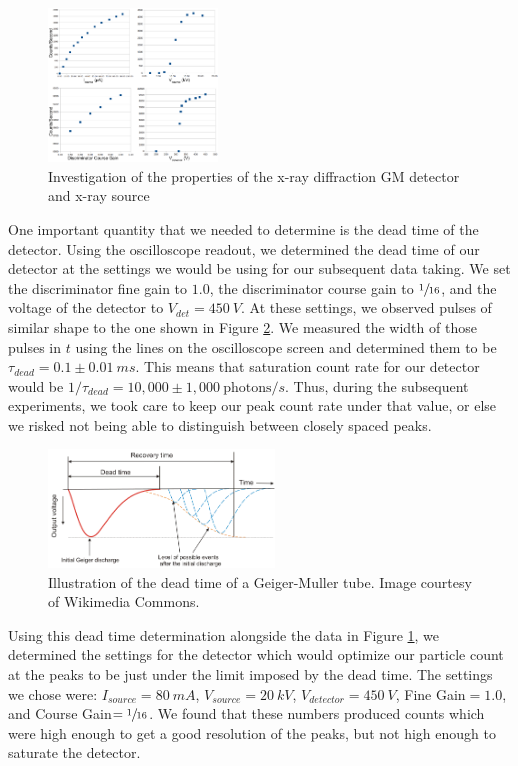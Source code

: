 \documentclass[%
 reprint,
 amsmath,amssymb,
 aps,
 pra,
]{revtex4-1}
\begin{document}
\begin{figure}[H]
	\centering
	\includegraphics[width=0.4\textwidth]{xrd_setup_investigation.png}
	\caption{Investigation of the properties of the x-ray diffraction GM detector and x-ray source}
	\label{fig:xrf_setup_investigation}
\end{figure}

One important quantity that we needed to determine is the dead time of the detector. Using the oscilloscope readout, we determined the dead time of our detector at the settings we would be using for our subsequent data taking. We set the discriminator fine gain to $1.0$, the discriminator course gain to $\sfrac{1}{16}$, and the voltage of the detector to $V_{det} = 450~V$. At these settings, we observed pulses of similar shape to the one shown in Figure \ref{fig:dead_time}. We measured the width of those pulses in $t$ using the lines on the oscilloscope screen and determined them to be $\tau_{dead} = 0.1 \pm 0.01~ms$. This means that saturation count rate for our detector would be $1/\tau_{dead} = 10,000 \pm 1,000~\text{photons}/s$. Thus, during the subsequent experiments, we took care to keep our peak count rate under that value, or else we risked not being able to distinguish between closely spaced peaks.

\begin{figure}[H]
	\centering
	\includegraphics[width=6cm]{dead_time.png}
	\caption{Illustration of the dead time of a Geiger-Muller tube. Image courtesy of Wikimedia Commons.}
	\label{fig:dead_time}
\end{figure}

Using this dead time determination alongside the data in Figure \ref{fig:xrf_setup_investigation}, we determined the settings for the detector which would optimize our particle count at the peaks to be just under the limit imposed by the dead time. The settings we chose were: $I_{source} = 80~mA$, $V_{source} = 20~kV$, $V_{detector} = 450~V$, Fine Gain$ = 1.0$, and Course Gain$ = \sfrac{1}{16}$. We found that these numbers produced counts which were high enough to get a good resolution of the peaks, but not high enough to saturate the detector.
\end{document}
